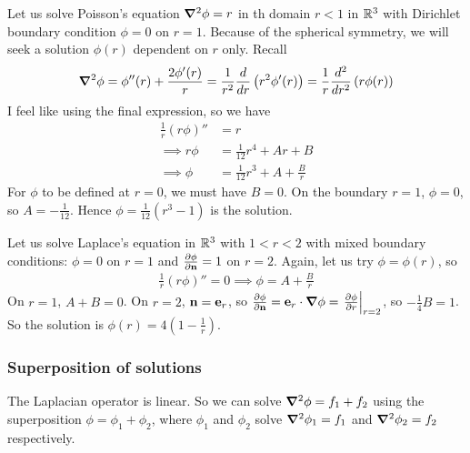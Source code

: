 \documentclass{../template/note}
\begin{document}
    \begin{example*}
        Let us solve Poisson's equation \(\grad^2 \phi = r\) in th domain \(r < 1\) in \(\mathbb R^3\) with Dirichlet boundary condition \(\phi = 0\) on \(r=1\). Because of the spherical symmetry, we will seek a solution \(\phi(r)\) dependent on \(r\) only. Recall
        \begin{align*}
            \grad^2\phi = \phi''(r) + \frac{2\phi'(r)}r = \frac 1 {r^2} \frac{d}{dr} \left(r^2\phi'(r)\right) = \frac 1 r \frac{d^2}{dr^2} \left(r\phi(r)\right)
        \end{align*}
        I feel like using the final expression, so we have
        \begin{align*}
            \frac 1 r (r\phi)'' &= r \\
            \implies r\phi &= \frac 1 {12}r^4 + Ar + B \\
            \implies \phi &= \frac 1 {12}r^3 + A + \frac B r
        \end{align*}
        For \(\phi\) to be defined at \(r=0\), we must have \(B = 0\). On the boundary \(r=1\), \(\phi=0\), so \(A = -\frac 1 {12}\). Hence \(\phi = \frac 1 {12}(r^3-1)\) is the solution.
    \end{example*}
    
    \begin{example*}
        Let us solve Laplace's equation in \(\mathbb R^3\) with \(1 < r < 2\) with mixed boundary conditions: \(\phi = 0\) on \(r=1\) and \(\pd{\phi}{\V n} = 1\) on \(r=2\). Again, let us try \(\phi = \phi(r)\), so
        \begin{align*}
            \frac 1 r(r\phi)'' = 0 \implies \phi = A + \frac B r
        \end{align*}
        On \(r=1\), \(A+B=0\). On \(r=2\), \(\V n = \V e_r\), so \(\pd{\phi}{\V n} = \V e_r \cdot \grad \phi = \left.\pd{\phi}{r}\right|_{r=2}\), so \(-\frac 1 4 B = 1\). So the solution is \(\phi(r) = 4\left(1-\frac 1 r\right)\).        
    \end{example*}
    
    \subsubsection{Superposition of solutions}

    The Laplacian operator is linear. So we can solve \(\grad^2 \phi = f_1 + f_2\) using the superposition \(\phi = \phi_1 + \phi_2\), where \(\phi_1\) and \(\phi_2\) solve \(\grad^2\phi_1 = f_1\) and \(\grad^2\phi_2 = f_2\) respectively.
\end{document}
